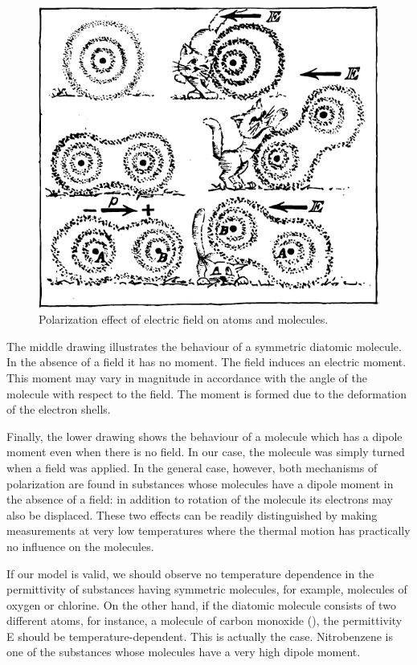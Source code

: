 \begin{figure}[!ht]
\centering
\includegraphics[width=\textwidth]{figures/fig-02-02.pdf}
\caption{Polarization effect of electric field on atoms and molecules.}
\label{fig-2.2}
\end{figure}

The middle drawing illustrates the behaviour of a symmetric diatomic molecule. In the absence of a field it has no moment. The field induces an electric moment. This moment may vary in magnitude in accordance with the angle of the molecule with respect to the field. The moment is formed due to the deformation of the electron shells.

Finally, the lower drawing shows the behaviour of a molecule which has a dipole moment even when there is no field. In our case, the molecule was simply turned when a field was applied. In the general case, however, both mechanisms of polarization are found in substances whose molecules have a dipole moment in the absence of a field: in addition to rotation of the molecule its electrons may also be displaced. These two effects can be readily distinguished by making measurements at very low temperatures where the thermal motion has practically no influence on the molecules.

If our model is valid, we should observe no temperature dependence in the permittivity of substances having symmetric molecules, for example, molecules of oxygen or chlorine. On the other hand, if the diatomic molecule consists of two different atoms, for instance, a molecule of carbon monoxide (), the permittivity E should be temperature-dependent. This is actually the case. Nitrobenzene is one of the substances whose molecules have a very high dipole moment.

